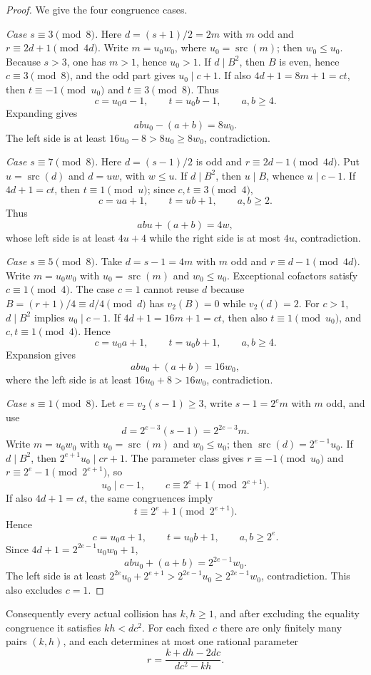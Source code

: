 \documentclass[11pt]{article}
\theoremstyle{definition}
\newcommand{\src}{\operatorname{src}}
\begin{document}
\begin{proof}
We give the four congruence cases.

\emph{Case $s\equiv3\pmod8$.} Here $d=(s+1)/2=2m$ with $m$ odd and $r\equiv2d+1\pmod{4d}$. Write $m=u_0w_0$, where $u_0=\src(m)$; then $w_0\le u_0$. Because $s>3$, one has $m>1$, hence $u_0>1$. If $d\mid B^2$, then $B$ is even, hence $c\equiv3\pmod8$, and the odd part gives $u_0\mid c+1$. If also $4d+1=8m+1=ct$, then $t\equiv-1\pmod{u_0}$ and $t\equiv3\pmod8$. Thus
\[
c=u_0a-1,\qquad t=u_0b-1,\qquad a,b\ge4.
\]
Expanding gives
\[
ab u_0-(a+b)=8w_0.
\]
The left side is at least $16u_0-8>8u_0\ge8w_0$, contradiction.

\emph{Case $s\equiv7\pmod8$.} Here $d=(s-1)/2$ is odd and $r\equiv2d-1\pmod{4d}$. Put $u=\src(d)$ and $d=uw$, with $w\le u$. If $d\mid B^2$, then $u\mid B$, whence $u\mid c-1$. If $4d+1=ct$, then $t\equiv1\pmod u$; since $c,t\equiv3\pmod4$,
\[
c=ua+1,\qquad t=ub+1,\qquad a,b\ge2.
\]
Thus
\[
ab u+(a+b)=4w,
\]
whose left side is at least $4u+4$ while the right side is at most $4u$, contradiction.

\emph{Case $s\equiv5\pmod8$.} Take $d=s-1=4m$ with $m$ odd and $r\equiv d-1\pmod{4d}$. Write $m=u_0w_0$ with $u_0=\src(m)$ and $w_0\le u_0$. Exceptional cofactors satisfy $c\equiv1\pmod4$. The case $c=1$ cannot reuse $d$ because $B=(r+1)/4\equiv d/4\pmod d$ has $v_2(B)=0$ while $v_2(d)=2$. For $c>1$, $d\mid B^2$ implies $u_0\mid c-1$. If $4d+1=16m+1=ct$, then also $t\equiv1\pmod{u_0}$, and $c,t\equiv1\pmod4$. Hence
\[
c=u_0a+1,\qquad t=u_0b+1,\qquad a,b\ge4.
\]
Expansion gives
\[
ab u_0+(a+b)=16w_0,
\]
where the left side is at least $16u_0+8>16w_0$, contradiction.

\emph{Case $s\equiv1\pmod8$.} Let $e=v_2(s-1)\ge3$, write $s-1=2^e m$ with $m$ odd, and use
\[
d=2^{e-3}(s-1)=2^{2e-3}m.
\]
Write $m=u_0w_0$ with $u_0=\src(m)$ and $w_0\le u_0$; then $\src(d)=2^{e-1}u_0$. If $d\mid B^2$, then $2^{e+1}u_0\mid cr+1$. The parameter class gives $r\equiv-1\pmod{u_0}$ and $r\equiv2^e-1\pmod{2^{e+1}}$, so
\[
u_0\mid c-1,\qquad c\equiv2^e+1\pmod{2^{e+1}}.
\]
If also $4d+1=ct$, the same congruences imply
\[
t\equiv2^e+1\pmod{2^{e+1}}.
\]
Hence
\[
c=u_0a+1,\qquad t=u_0b+1,\qquad a,b\ge2^e.
\]
Since $4d+1=2^{2e-1}u_0w_0+1$,
\[
ab u_0+(a+b)=2^{2e-1}w_0.
\]
The left side is at least $2^{2e}u_0+2^{e+1}>2^{2e-1}u_0\ge2^{2e-1}w_0$, contradiction. This also excludes $c=1$.
\end{proof}

Consequently every actual collision has $k,h\ge1$, and after excluding the equality congruence it satisfies $kh<dc^2$. For each fixed $c$ there are only finitely many pairs $(k,h)$, and each determines at most one rational parameter
\[
r=\frac{k+dh-2dc}{dc^2-kh}.
\]
\end{document}
